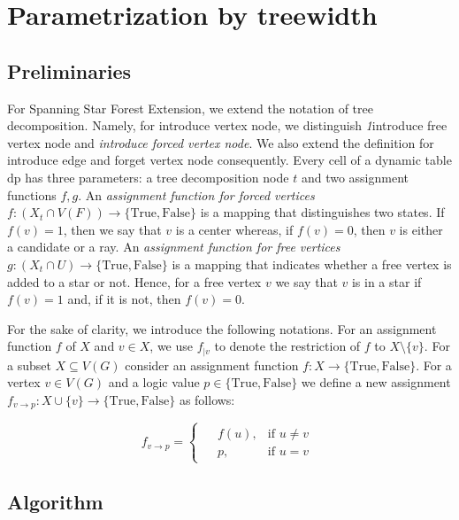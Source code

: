 \documentclass[en]{pracamgr}
\theoremstyle{definition}
\newcommand{\ssfep}{{\sc Spanning Star Forest Extension}}
\newcommand{\true}{\textrm{True}}
\newcommand{\false}{\textrm{False}}
\begin{document}
\section{Parametrization by treewidth}

\subsection{Preliminaries}

For \ssfep{}, we extend the notation of tree decomposition. Namely, for introduce vertex node, we distinguish \textit1{introduce free vertex node} and \textit{introduce forced vertex node}. We also extend the definition for introduce edge and forget vertex node consequently. Every cell of a dynamic table $\text{dp}$ has three parameters: a tree decomposition node $t$ and two assignment functions $f,g$. An \textit{assignment function for forced vertices} $f: (X_t \cap V(F)) \rightarrow \{\true, \false\}$ is a mapping that distinguishes two states. If $f(v)=1$, then we say that $v$ is a center whereas, if $f(v)=0$, then $v$ is either a candidate or a ray. An \textit{assignment function for free vertices} $g: (X_t \cap U) \rightarrow \{\true, \false\}$ is a mapping that indicates whether a free vertex is added to a star or not. Hence, for a free vertex $v$ we say that $v$ is in a star if $f(v)=1$ and, if it is not, then $f(v)=0$.

For the sake of clarity, we introduce the following notations. For an assignment function $f$ of $X$ and $v \in X$, we use $f_{|v}$ to denote the restriction of $f$ to $X \setminus \{v\}$. For a subset $X \subseteq V(G)$ consider an assignment function $f:X \rightarrow \{\true,\false\}$. For a vertex $v \in V(G)$ and a logic value $p \in \{\true, \false\}$ we define a new assignment $f_{v \rightarrow p}: X \cup \{v\} \rightarrow \{\true, \false\}$ as follows:

\begin{equation*}
	f_{v \rightarrow p} =
	\begin{cases}
	\begin{aligned}
		&f(u), & \text{if $u \neq v$} \\
		&p, &\text{if $u = v$}
	\end{aligned}
	\end{cases}
\end{equation*}

\subsection{Algorithm}
\end{document}
